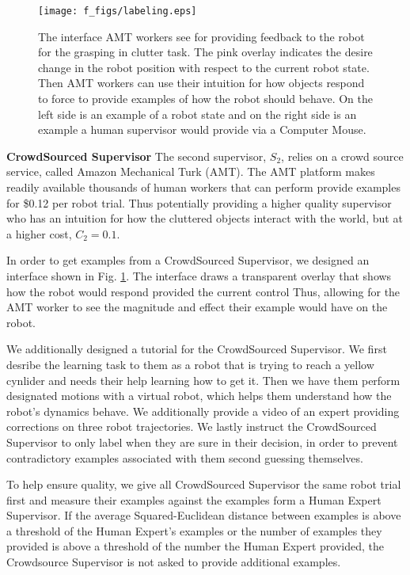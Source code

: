 \documentclass[10pt, conference]{ieeeconf}      %
\begin{document}
\begin{figure}[t]
\centering

\texttt{[image: f\_figs/labeling.eps]}

\caption{\footnotesize  The interface AMT workers see for providing feedback to the robot for the grasping in clutter task. The pink overlay indicates the desire change in the robot position with respect to the current robot state. Then AMT workers can use their intuition for how objects respond to force to provide examples of how the robot should behave. On the left side is an example of a robot state and on the right side is an example a human supervisor would provide via a Computer Mouse.}
\vspace*{-10pt}
\label{fig:overlays}
\end{figure}

\noindent \textbf{CrowdSourced Supervisor} The second supervisor, $S_2$, relies on a crowd source service, called Amazon Mechanical Turk (AMT). The AMT platform makes readily available thousands of human workers that can perform  provide examples for  \$0.12 per robot trial. Thus potentially providing a higher quality supervisor who has an intuition for how the cluttered objects interact with the world, but at a  higher cost, $C_2 = 0.1$.

In order to get examples from a CrowdSourced Supervisor, we designed an interface shown in Fig. \ref{fig:overlays}. The interface draws a transparent overlay that shows how the robot would respond provided the current control Thus, allowing for the AMT worker to see the magnitude and effect their example would have on the robot.

We additionally designed a tutorial for the CrowdSourced Supervisor. We first desribe the learning task to them as a robot that is trying to reach a yellow cynlider and needs their help learning how to get it. Then we have them perform designated motions with a virtual robot, which helps them understand how the robot's dynamics behave. We additionally provide a video of an expert providing corrections on three robot trajectories. We lastly instruct the CrowdSourced Supervisor to only label when they are sure in their decision, in order to prevent contradictory examples associated with them second guessing themselves.  

To help ensure quality, we give all CrowdSourced Supervisor the same robot trial first and measure their examples against the examples form a  Human Expert Supervisor. If the average Squared-Euclidean distance between examples is above a threshold of the Human Expert's examples or the number of examples they provided is above a threshold of the number the Human Expert provided, the Crowdsource Supervisor is not asked to provide additional examples.
\end{document}
